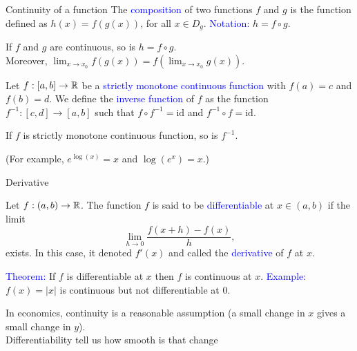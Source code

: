 \documentclass[11pt,aspectratio=169]{beamer}
\begin{document}
\begin{frame}{Continuity of a function}
The \textcolor{blue}{composition} of two functions $f$ and $g$ is the function  defined as
$h(x)=f(g(x))$, for all $x \in D_g$. 
\textcolor{blue}{Notation:} $h=f \circ g$.
\begin{block}{}
	If $f$ and $g$ are continuous, so is $h=f\circ g$. \\[3mm]
	\qquad Moreover, $\lim_{x\to x_0} f(g(x))=f(\lim_{x\to x_0}g(x))$.
\end{block}


\vskip 12pt
Let $f:[a,b] \rightarrow \mathbb R$ be a \textcolor{blue}{strictly monotone continuous function} with $f(a)=c$ and $f(b)=d$.  We define the \textcolor{blue}{inverse function} of $f$ as the function $f^{-1}:[c,d] \rightarrow [a,b]$ such that $f \circ f^{-1}=\text{id}$ and $f^{-1} \circ f=\text{id}$.
\begin{block}{}
	If $f$ is strictly monotone continuous function, so is $f^{-1}$. 
\end{block}

\begin{tiny} (For example, $e^{\log(x)}=x$ and $\log(e^x)=x$.) \end{tiny}
\end{frame}

\begin{frame}{Derivative}

Let $f:(a,b) \rightarrow \mathbb R$. The function $f$ is said to be \textcolor{blue}{differentiable} at $x \in (a,b)$ if the limit
$$
\lim_{h \rightarrow 0} \frac{f(x+h)-f(x)}{h},
$$
exists. In this case, it denoted $f'(x)$ and called the \textcolor{blue}{derivative} of $f$ at $x$.

\vskip 12pt
\vskip 12pt

\textcolor{blue}{Theorem:} If $f$ is differentiable at $x$ then $f$ is continuous at $x$.
\vskip 12pt
\textcolor{blue}{Example:} $f(x)=\vert x\vert$ is continuous but not differentiable at $0$.
\vskip 12pt
\begin{tiny}In economics, continuity is a reasonable assumption (a small change in $x$ gives a small change in $y$).\\ 
Differentiability tell us how smooth is that change\end{tiny}
\end{frame}
\end{document}
